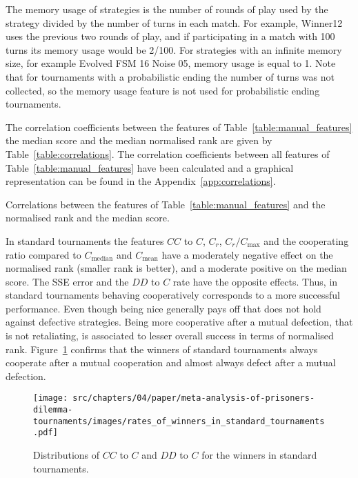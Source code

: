 The memory usage of strategies is the number of
rounds of play used by the strategy divided by the number of turns in each match.
For example, Winner12 uses the previous two rounds of play, and if participating
in a match with 100 turns its memory usage would be 2/100.
For strategies with an infinite memory size, for example Evolved
FSM 16 Noise 05, memory usage is equal to 1.
Note that for tournaments with a probabilistic
ending the number of turns was not collected, so the memory usage feature is not
used for probabilistic ending tournaments.

The correlation coefficients between the features of
Table~\ref{table:manual_features} the median score and the median normalised
rank are given by Table~\ref{table:correlations}. The correlation coefficients
between all features of Table~\ref{table:manual_features} have been calculated
and a graphical representation can be found in the
Appendix~\ref{app:correlations}.

\begin{table}[!htbp]
    \begin{center}
    \resizebox{.9\textwidth}{!}{
        
    }
\end{center}
\caption{Correlations between the features of Table~\ref{table:manual_features}
and the normalised rank and the median score.}\label{table:correlations}
\end{table}

In standard tournaments the features $CC$ to $C$, $C_r$, $C_r / C_{\text{max}}$
and the cooperating ratio compared to $C_{\text{median}}$ and $C_{\text{mean}}$
have a moderately negative effect on the normalised rank (smaller rank is better), and a moderate positive
on the median score. The SSE error and the $DD$ to $C$ rate have the opposite
effects. Thus, in standard tournaments behaving cooperatively corresponds to a
more successful performance. Even though being nice generally pays off
that does not hold against defective strategies. Being more cooperative after a mutual
defection, that is not retaliating, is associated to lesser overall success in terms of normalised rank.
Figure~\ref{fig:rates_of_winners_in_standard_tournaments} confirms that the
winners of standard tournaments always cooperate after a mutual cooperation and
almost always defect after a mutual defection.

\begin{figure}[!htbp]
    \centering
    \texttt{[image: src/chapters/04/paper/meta-analysis-of-prisoners-dilemma-tournaments/images/rates\_of\_winners\_in\_standard\_tournaments.pdf]}
    \caption{Distributions of $CC$ to $C$ and $DD$ to $C$ for the winners in
    standard tournaments.}\label{fig:rates_of_winners_in_standard_tournaments}
\end{figure}

